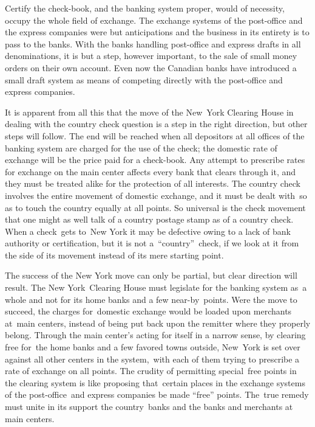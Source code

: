 \documentclass[openany,nobib]{tufte-book}
\begin{document}
Certify the check-book, and the banking system proper, would of
necessity, occupy the whole field of exchange. The exchange systems of
the post-office and the express companies were but anticipations and the
business in its entirety is to pass to the banks. With the banks
handling post-office and express drafts in all denominations, it is but
a step, however important, to the sale of small money orders on their
own account. Even now the Canadian banks have introduced a small draft
system as means of competing directly with the post-office and express
companies.~

It is apparent from all this that the move of the New~York Clearing
House in dealing with the country check question is a step in the right
direction, but other steps will follow. The end will be reached when all
depositors at all offices of the banking system are charged for the use
of the check; the domestic rate of exchange will be the price paid for a
check-book. Any attempt to prescribe rates for exchange on the main
center affects every bank that clears through it, and they must be
treated alike for the protection of all interests. The country check
involves the entire movement of domestic exchange, and it must be dealt
with~so as to touch the country equally at all points. So universal is
the check movement that one might as well talk of a country postage
stamp as of a country check. When a check~gets to~New York it may be
defective owing to a lack of bank authority or certification, but it is
not a~``country''~check, if we look at it from the side of its movement
instead of its mere starting point.~

The success of the New York move can only be partial, but clear
direction will result. The New York~Clearing House must legislate for
the banking system as~a whole and not for its home banks and a few
near-by~points. Were the move to succeed, the charges for~domestic
exchange would be loaded upon merchants at~main centers, instead of
being put back upon the remitter where they properly belong. Through the
main center's acting for itself in a narrow sense, by clearing free
for~the home banks and a few favored towns outside, New~York is set over
against all other centers in the system,~with each of them trying to
prescribe a rate of exchange on all points. The crudity of permitting
special~free points in the clearing system is like proposing
that~certain places in the exchange systems of the post-office~and
express companies be made ``free'' points. The~true remedy must unite in
its support the country~banks and the banks and merchants at main
centers.~
\end{document}
